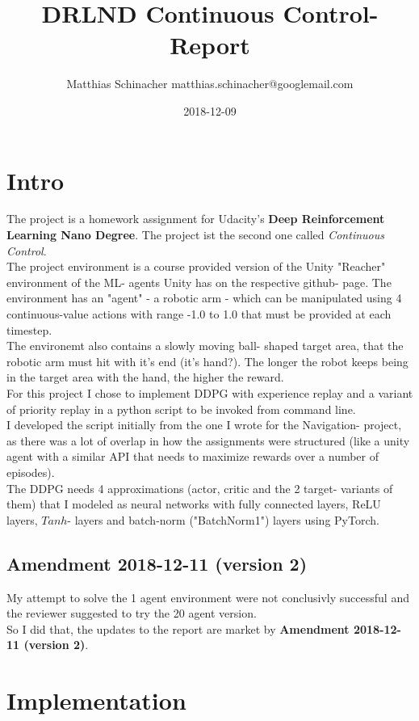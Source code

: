 \documentclass[a4paper]{article}
\title{DRLND Continuous Control- Report}
\date{2018-12-09}
\author{Matthias Schinacher matthias.schinacher@googlemail.com}
\begin{document}
\maketitle
\tableofcontents
\newpage

\section{Intro}
The project is a homework assignment for Udacity's \textbf{Deep Reinforcement Learning Nano Degree}.
The project ist the second one called \textit{Continuous Control}.
\\
The project environment is a course provided version of the Unity "Reacher"
environment of the ML- agents Unity has on the respective github- page.
The environment has an "agent" - a robotic arm - which can be manipulated
using 4 continuous-value actions with range -1.0 to 1.0 that must be provided
at each timestep.
\\
The environemt also contains a slowly moving ball- shaped target area,
that the robotic arm must hit with it's end (it's hand?).
The longer the robot keeps being in the target area with the hand,
the higher the reward.
\\
For this project I chose to implement DDPG with experience replay and
a variant of priority replay in a python script to be invoked from command line.
\\
I developed the script initially from the one I wrote for the Navigation- project,
as there was a lot of overlap in how the assignments were structured (like
a unity agent with a similar API that needs to maximize rewards over a
number of episodes).
\\
The DDPG needs 4 approximations (actor, critic and the 2 target- variants of them)
that I modeled as neural networks with fully connected layers, ReLU layers,
$Tanh$- layers and batch-norm ("BatchNorm1") layers using PyTorch.

\subsection{Amendment 2018-12-11 (version 2)}
My attempt to solve the 1 agent environment were not conclusivly successful
and the reviewer suggested to try the 20 agent version.
\\
So I did that, the updates to the report are market by
\textbf{Amendment 2018-12-11 (version 2)}.

\section{Implementation}
\end{document}

